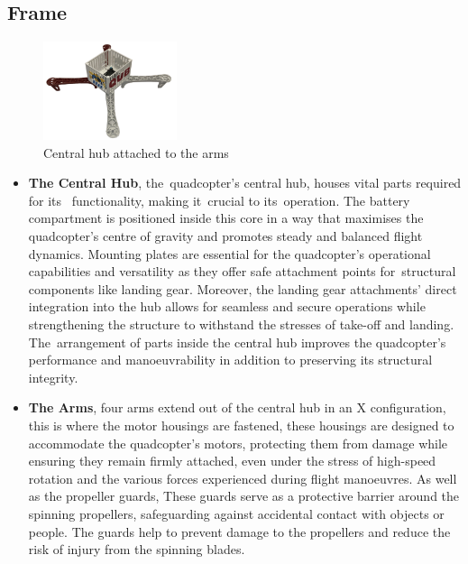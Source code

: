 \documentclass{report}
\begin{document}
\subsection*{Frame}
\begin{figure}[H]
  \centering
  \includegraphics[width=0.35\textwidth]{Pictures/frame_housing.png} 
  \caption{Central hub attached to the arms}
  \label{fig:Central_hub_arms}
\end{figure}
\begin{itemize}
  \item \textbf{The Central Hub}, the quadcopter's central hub, houses vital
  parts required for its  functionality, making it crucial to its operation. The
  battery compartment is positioned inside this core in a way that maximises the
  quadcopter's centre of gravity and promotes steady and balanced flight
  dynamics. Mounting plates are essential for the quadcopter's operational
  capabilities and versatility as they offer safe attachment points
  for structural components like landing gear. Moreover, the landing gear
  attachments' direct integration into the hub allows for seamless and secure
  operations while strengthening the structure to withstand the stresses of
  take-off and landing. The arrangement of parts inside the central hub improves
  the quadcopter's performance and manoeuvrability in addition to preserving its
  structural integrity.
  \item \textbf{The Arms}, four arms extend out of the central hub in an X
  configuration, this is where the motor housings are fastened, these housings
  are designed to accommodate the quadcopter's motors, protecting them from
  damage while ensuring they remain firmly attached, even under the stress of
  high-speed rotation and the various forces experienced during flight
  manoeuvres. As well as the propeller guards, These guards serve as a protective
  barrier around the spinning propellers, safeguarding against accidental
  contact with objects or people. The guards help to prevent damage to the
  propellers and reduce the risk of injury from the spinning blades.
\end{itemize}
\end{document}
